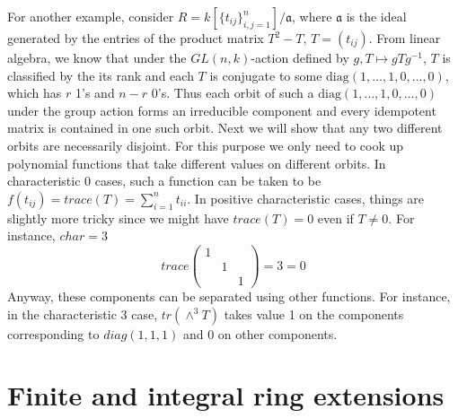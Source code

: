 \begin{example}
\label{example-idempotent-matrices}
For another example, consider
$R = k[\{t_{ij}\}_{i, j = 1}^{n}]/\mathfrak a$, where $\mathfrak a$ is
the ideal generated by the entries of the product matrix $T^2-T$,
$T = (t_{ij})$. From linear algebra, we know that under the
$GL(n, k)$-action defined by $g, T \mapsto gTg^{-1}$, $T$ is
classified by the its rank and each $T$ is conjugate to some
$\text{diag}(1, \ldots, 1, 0, \ldots, 0)$, which has $r$ 1's and $n-r$ 0's.
Thus each orbit of such a $\text{diag}(1, \ldots, 1, 0, \ldots, 0)$ under the
group action forms an irreducible component and every idempotent
matrix is contained in one such orbit. Next we will show that any
two different orbits are necessarily disjoint. For this purpose we
only need to cook up polynomial functions that take different
values on different orbits. In characteristic 0 cases, such a
function can be taken to be
$f(t_{ij}) = trace(T) = \sum_{i = 1}^nt_{ii}$. In positive
characteristic cases, things are slightly more tricky since we
might have $trace(T) = 0$ even if $T \neq 0$. For instance, $char = 3$
$$
trace\left(
\begin{matrix}
1 & &\\
& 1 &\\
& & 1
\end{matrix}
\right) = 3 = 0
$$
Anyway, these components can be separated using other functions.
For instance, in the characteristic 3 case, $tr(\wedge^3T)$ takes
value 1 on the components corresponding to $diag(1, 1, 1)$ and 0 on
other components.
\end{example}





































\section{Finite and integral ring extensions}
\label{section-finite-ring-extensions}

